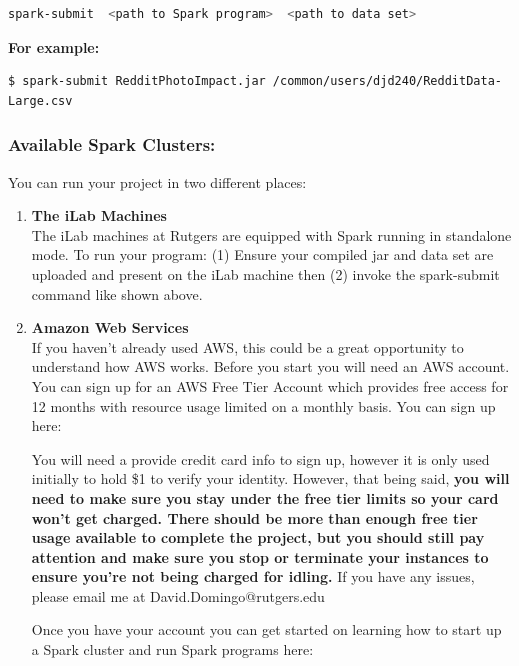 \documentclass{article}
\begin{document}
\vspace{0.1cm}
\begin{lstlisting}[language=bash]
        spark-submit  <path to Spark program>  <path to data set>
\end{lstlisting}
\vspace{0.1cm}

\noindent \textbf{For example:}
\begin{commandline}
\begin{verbatim}$ spark-submit RedditPhotoImpact.jar /common/users/djd240/RedditData-Large.csv
\end{verbatim}
\end{commandline}

\subsubsection*{Available Spark Clusters:}
You can run your project in two different places:
\begin{enumerate}
    \item \textbf{The iLab Machines}\\ 
    The iLab machines at Rutgers are equipped with Spark running in standalone mode. To run your program: (1) Ensure your compiled jar and data set are uploaded and present on the iLab machine then (2) invoke the spark-submit command like shown above. 
    \item \textbf{Amazon Web Services}\\
    If you haven't already used AWS, this could be a great opportunity to understand how AWS works. Before you start you will need an AWS account. You can sign up for an AWS Free Tier Account which provides free access for 12 months with resource usage limited on a monthly basis. You can sign up here: \href{https://aws.amazon.com/free/}{\color{blue}{https://aws.amazon.com/free/}}
	\begin{info}[Note:]
	You will need a provide credit card info to sign up, however it is only used initially to hold \$1 to verify your identity. However, that being said, \textbf{you will need to make sure you stay under the free tier limits so your card won't get charged. There should be more than enough free tier usage available to complete the project, but you should still pay attention and make sure you stop or terminate your instances to ensure you're not being charged for idling.} If you have any issues, please email me at David.Domingo@rutgers.edu
	\end{info}
    
    	Once you have your account you can get started on learning how to start up a Spark cluster and run Spark programs  here: \\
	\href{https://github.com/DaveedDomingo/Spark-Reddit-Netflix-Project/blob/master/SparkOnAWS.pdf}{\color{blue}{https://github.com/DaveedDomingo/Spark-Reddit-Netflix-Project/blob/master/SparkOnAWS.pdf}}
\end{enumerate}
\end{document}
